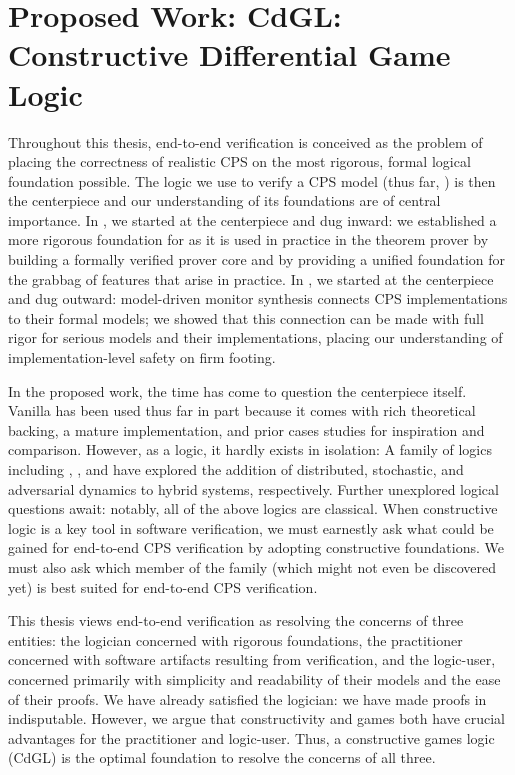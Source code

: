 \documentclass[12pt]{cmuthesis}
\theoremstyle{definition}
\theoremstyle{remark}
\newcommand{\rref}[2][]{\prettyref{#2}}
\newcommand{\CdGL}{\textsf{CdGL}\xspace}
\begin{document}
\chapter{Proposed Work: \CdGL: Constructive Differential Game Logic}
\label{ch:cdgl}
Throughout this thesis, end-to-end verification is conceived as the problem of placing the correctness of realistic CPS on the most rigorous, formal logical foundation possible.
The logic we use to verify a CPS model (thus far, \dL) is then the centerpiece and our understanding of its foundations are of central importance.
In \rref{ch:logical-foundations}, we started at the centerpiece and dug inward: we established a more rigorous foundation for \dL as it is used in practice in the theorem prover by building a formally verified prover core and by providing a unified foundation for the grabbag of features that arise in practice.
In \rref{ch:end-to-end-v}, we started at the centerpiece and dug outward: model-driven monitor synthesis connects CPS implementations to their formal models;
we showed that this connection can be made with full rigor for serious models and their implementations, placing our understanding of implementation-level safety on firm footing.

In the proposed work, the time has come to question the centerpiece itself.
Vanilla \dL has been used thus far in part because it comes with rich theoretical backing, a mature implementation, and prior cases studies for inspiration and comparison.
However, as a logic, it hardly exists in isolation: A family of logics including \QdL, \SdL, and \dGL have explored the addition of distributed, stochastic, and adversarial dynamics to hybrid systems, respectively.
Further unexplored logical questions await: notably, all of the above logics are classical.
When constructive logic is a key tool in software verification, we must earnestly ask what could be gained for end-to-end CPS verification by adopting constructive foundations.
We must also ask which member of the \dL family (which might not even be discovered yet) is best suited for end-to-end CPS verification.

This thesis views end-to-end verification as resolving the concerns of three entities:
the logician concerned with rigorous foundations, the practitioner concerned with software artifacts resulting from verification, and the logic-user, concerned primarily with simplicity and readability of their models and the ease of their proofs.
We have already satisfied the logician: we have made \dL proofs in \KeYmaeraX indisputable.
However, we argue that constructivity and games both have crucial advantages for the practitioner and logic-user.
Thus, a constructive games logic (\CdGL) is the optimal foundation to resolve the concerns of all three.
\end{document}
